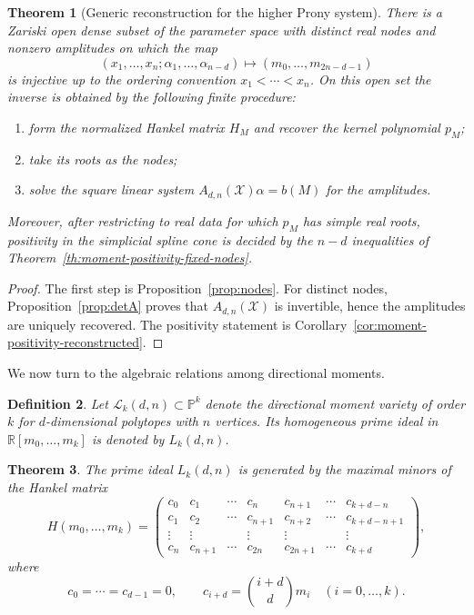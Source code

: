 \documentclass[reqno]{amsart}
\newtheorem{theorem}{Theorem}
\numberwithin{theorem}{section}
\newtheorem{definition}[theorem]{Definition}
\newcommand{\PP}{\mathbb{P}}
\newcommand{\RR}{\mathbb{R}}
\newcommand{\cX}{\mathcal{X}}
\begin{document}
\begin{theorem}[Generic reconstruction for the higher Prony system]\label{th:generic-reconstruction}
There is a Zariski open dense subset of the parameter space with distinct real nodes and nonzero amplitudes on which the map
\[
(x_1,\dots,x_n;\alpha_1,\dots,\alpha_{n-d})
\longmapsto
(m_0,\dots,m_{2n-d-1})
\]
is injective up to the ordering convention $x_1<\cdots<x_n$. On this open set the inverse is obtained by the following finite procedure:
\begin{enumerate}
    \item form the normalized Hankel matrix $H_M$ and recover the kernel polynomial $p_M$;
    \item take its roots as the nodes;
    \item solve the square linear system $A_{d,n}(\cX)\alpha=b(M)$ for the amplitudes.
\end{enumerate}
Moreover, after restricting to real data for which $p_M$ has simple real roots, positivity in the simplicial spline cone is decided by the $n-d$ inequalities of Theorem~\ref{th:moment-positivity-fixed-nodes}.
\end{theorem}

\begin{proof}
The first step is Proposition~\ref{prop:nodes}. For distinct nodes, Proposition~\ref{prop:detA} proves that $A_{d,n}(\cX)$ is invertible, hence the amplitudes are uniquely recovered. The positivity statement is Corollary~\ref{cor:moment-positivity-reconstructed}.
\end{proof}

We now turn to the algebraic relations among directional moments.

\begin{definition}
Let $\mathcal{L}_k(d,n)\subset \PP^k$ denote the \emph{directional moment variety of order $k$ for $d$-dimensional polytopes with $n$ vertices}. Its homogeneous prime ideal in $\RR[m_0,\dots,m_k]$ is denoted by $L_k(d,n)$.
\end{definition}

\begin{theorem}\label{th:directional-hankel}
The prime ideal $L_k(d,n)$ is generated by the maximal minors of the Hankel matrix
\[
H(m_0,\dots,m_k)=
\left(
\begin{array}{ccccccc}
c_0 & c_1 & \cdots & c_n & c_{n+1} & \cdots & c_{k+d-n} \\
c_1 & c_2 & \cdots & c_{n+1} & c_{n+2} & \cdots & c_{k+d-n+1} \\
\vdots & \vdots & & \vdots & \vdots & & \vdots \\
c_n & c_{n+1} & \cdots & c_{2n} & c_{2n+1} & \cdots & c_{k+d}
\end{array}
\right),
\]
where
\[
c_0=\cdots=c_{d-1}=0, \qquad c_{i+d}=\binom{i+d}{d}m_i \quad (i=0,\dots,k).
\]
\end{theorem}
\end{document}
